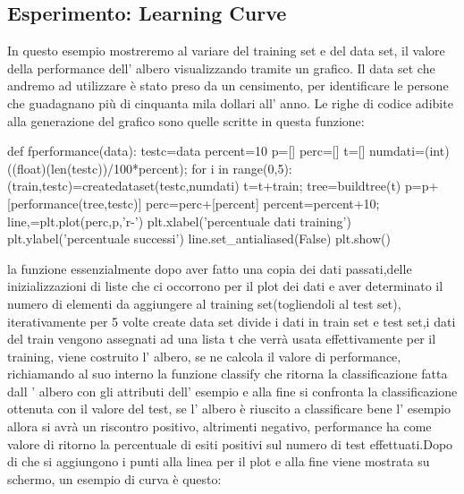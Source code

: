 		\subsection{Esperimento: Learning Curve}
		In questo esempio mostreremo al variare del training set e del data set, il valore della performance dell' albero visualizzando tramite un grafico.
		Il data set che andremo ad utilizzare è stato preso da un censimento, per identificare le persone che guadagnano più di cinquanta mila dollari all' anno.
		Le righe di codice adibite alla generazione del grafico sono quelle scritte in questa funzione:
		\begin{python}
		def fperformance(data):
			testc=data
			percent=10
			p=[]
			perc=[]
			t=[]
			numdati=(int)((float)(len(testc))/100*percent);
			for i in range(0,5):
				(train,testc)=createdataset(testc,numdati)
				t=t+train;
				tree=buildtree(t)
				p=p+[performance(tree,testc)]
				perc=perc+[percent]
				percent=percent+10;
				line,=plt.plot(perc,p,'r-')
			plt.xlabel('percentuale dati training')
			plt.ylabel('percentuale successi')
			line.set_antialiased(False)
			plt.show()
		\end{python}
		\bigskip
		la funzione essenzialmente dopo aver fatto una copia dei dati passati,delle inizializzazioni di liste che ci occorrono per il plot dei dati e aver determinato il numero di elementi da aggiungere al training set(togliendoli al test set), iterativamente per 5 volte create data set divide i dati in train set e test set,i dati del train vengono assegnati ad una lista t che verrà usata effettivamente per il training, viene costruito l' albero, se ne calcola il valore di performance, richiamando al suo interno la funzione classify che ritorna la classificazione fatta dall ' albero con gli attributi dell' esempio e alla fine si confronta la classificazione ottenuta con il valore del test, se l' albero è riuscito a classificare bene l' esempio allora si avrà un riscontro positivo, altrimenti negativo, performance  ha come valore di ritorno la percentuale di esiti positivi sul numero di test effettuati.Dopo di che si aggiungono i punti alla linea per il plot e alla fine viene mostrata su schermo, un esempio di curva è questo:
